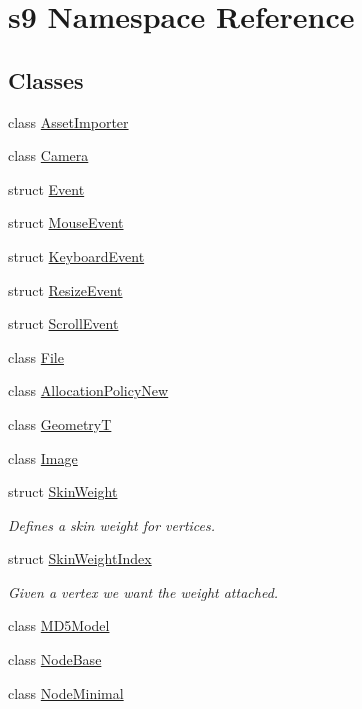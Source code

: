 \hypertarget{namespaces9}{\section{s9 Namespace Reference}
\label{namespaces9}
}
\subsection*{Classes}
\begin{DoxyCompactItemize}
\item 
class \hyperlink{classs9_1_1AssetImporter}{Asset\-Importer}
\item 
class \hyperlink{classs9_1_1Camera}{Camera}
\item 
struct \hyperlink{structs9_1_1Event}{Event}
\item 
struct \hyperlink{structs9_1_1MouseEvent}{Mouse\-Event}
\item 
struct \hyperlink{structs9_1_1KeyboardEvent}{Keyboard\-Event}
\item 
struct \hyperlink{structs9_1_1ResizeEvent}{Resize\-Event}
\item 
struct \hyperlink{structs9_1_1ScrollEvent}{Scroll\-Event}
\item 
class \hyperlink{classs9_1_1File}{File}
\item 
class \hyperlink{classs9_1_1AllocationPolicyNew}{Allocation\-Policy\-New}
\item 
class \hyperlink{classs9_1_1GeometryT}{Geometry\-T}
\item 
class \hyperlink{classs9_1_1Image}{Image}
\item 
struct \hyperlink{structs9_1_1SkinWeight}{Skin\-Weight}
\begin{DoxyCompactList}\small\item\em Defines a skin weight for vertices. \end{DoxyCompactList}\item 
struct \hyperlink{structs9_1_1SkinWeightIndex}{Skin\-Weight\-Index}
\begin{DoxyCompactList}\small\item\em Given a vertex we want the weight attached. \end{DoxyCompactList}\item 
class \hyperlink{classs9_1_1MD5Model}{M\-D5\-Model}
\item 
class \hyperlink{classs9_1_1NodeBase}{Node\-Base}
\item 
class \hyperlink{classs9_1_1NodeMinimal}{Node\-Minimal}
\item 

\end{DoxyCompactItemize}
